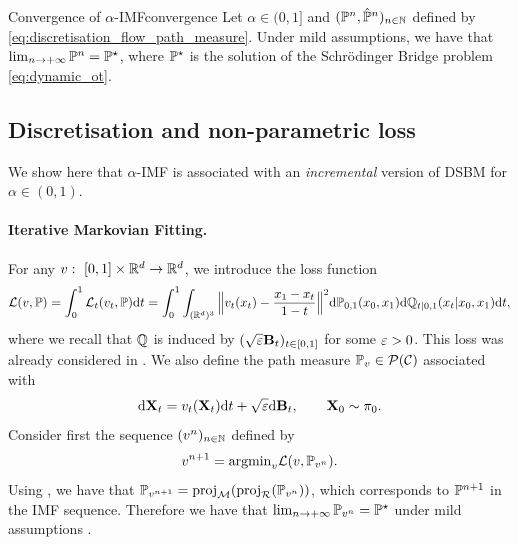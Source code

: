 \documentclass{article}
\begin{document}
\begin{theorem}{Convergence of $\alpha$-IMF}{convergence}
Let $\alpha \in (0, 1]$ and $(\mathbb{P}^n, \hat{\mathbb{P}}^n)_{n \in \mathbb{N}}$ defined by \eqref{eq:discretisation_flow_path_measure}. 
    Under mild assumptions, we have that 
    $\lim_{n \to +\infty} \mathbb{P}^n = \mathbb{P}^\star$, where $\mathbb{P}^\star$ is the solution of the Schr\"odinger Bridge problem \eqref{eq:dynamic_ot}.
\end{theorem}

\subsection{Discretisation and non-parametric loss}
We show here that $\alpha$-IMF is associated with an \emph{incremental} version of DSBM for $\alpha \in (0,1)$. 

\paragraph{Iterative Markovian Fitting.}  For any $v: \ [0,1] \times \mathbb{R}^d \to \mathbb{R}^d$, we introduce the loss function
\begin{equation}
\label{eq:loss_function}
   \Lnonparam(v, \Pbb)  = \int_0^1\Lnonparam_t(v_t, \Pbb) \rmd t = \int_0^1 \int_{(\rset^d)^3} \Big\| v_t(x_t) - \frac{x_1 - x_t}{1 - t} \Big\|^2 \rmd \Pbb_{0,1}(x_0,x_1) \rmd \Qbb_{t|0,1}(x_t | x_0, x_1) \rmd t ,
\end{equation}
where we recall that $\mathbb{Q}$ is induced by $(\sqrt{\varepsilon} \mathbf{B}_t)_{t \in [0,1]}$ for some $\varepsilon >0$. 
This loss was already considered in \citep{peluchettinon,lipman_flow_2022,liu2023I2SB,liu2022rectified,shi2023DSBM}.  We also define the path measure $\mathbb{P}_v \in \mathcal{P}(\mathcal{C})$ associated with  
\begin{equation}
\label{eq:mixture_bridge_sde}
    \rmd \bfX_t = v_t(\bfX_t) \rmd t + \sqrt{\vareps} \rmd \bfB_t , \qquad \bfX_0 \sim \pi_0 . 
\end{equation}
Consider first the sequence $(v^n)_{n \in \mathbb{N}}$ defined by 
\begin{equation}
\label{eq:view_dsbm_non_param}
    v^{n+1} = \argmin_v \Lnonparam(v, \Pbb_{v^n}) .
\end{equation}
Using , we have that $\mathbb{P}_{v^{n+1}} = \mathrm{proj}_{\mathcal{M}}(\mathrm{proj}_{\mathcal{R}}(\mathbb{P}_{v^n}))$, which corresponds to $\mathbb{P}^{n+1}$ in the IMF sequence. Therefore we have that $ \lim_{n \to +\infty} \mathbb{P}_{v^n} = \mathbb{P}^\star$ under mild assumptions \citep[Theorem 2]{peluchetti_diffusion_2023}. 
\end{document}
